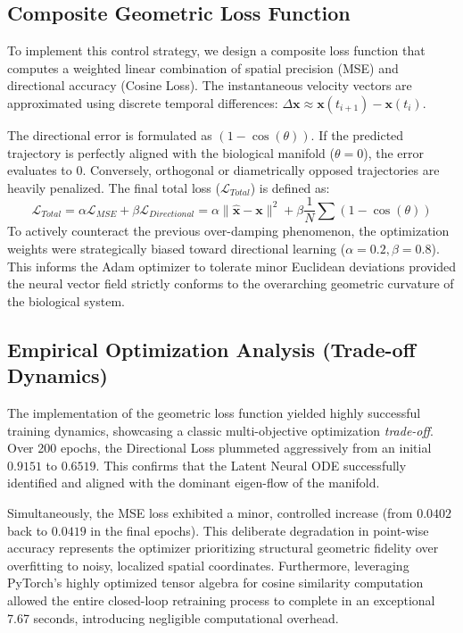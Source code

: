\documentclass[12pt, a4paper]{article}
\begin{document}
	\subsection{Composite Geometric Loss Function}
	To implement this control strategy, we design a composite loss function that computes a weighted linear combination of spatial precision (MSE) and directional accuracy (Cosine Loss). The instantaneous velocity vectors are approximated using discrete temporal differences: $\Delta \mathbf{x} \approx \mathbf{x}(t_{i+1}) - \mathbf{x}(t_i)$.
	
	The directional error is formulated as $(1 - \cos(\theta))$. If the predicted trajectory is perfectly aligned with the biological manifold ($\theta = 0$), the error evaluates to $0$. Conversely, orthogonal or diametrically opposed trajectories are heavily penalized. The final total loss ($\mathcal{L}_{Total}$) is defined as:
	$$ \mathcal{L}_{Total} = \alpha \mathcal{L}_{MSE} + \beta \mathcal{L}_{Directional} = \alpha \| \mathbf{\hat{x}} - \mathbf{x} \|^2 + \beta \frac{1}{N} \sum (1 - \cos(\theta)) $$
	To actively counteract the previous over-damping phenomenon, the optimization weights were strategically biased toward directional learning ($\alpha = 0.2, \beta = 0.8$). This informs the Adam optimizer to tolerate minor Euclidean deviations provided the neural vector field strictly conforms to the overarching geometric curvature of the biological system.
	
	\subsection{Empirical Optimization Analysis (Trade-off Dynamics)}
	The implementation of the geometric loss function yielded highly successful training dynamics, showcasing a classic multi-objective optimization \textit{trade-off}. Over 200 epochs, the Directional Loss plummeted aggressively from an initial $0.9151$ to $0.6519$. This confirms that the Latent Neural ODE successfully identified and aligned with the dominant eigen-flow of the manifold.
	
	Simultaneously, the MSE loss exhibited a minor, controlled increase (from $0.0402$ back to $0.0419$ in the final epochs). This deliberate degradation in point-wise accuracy represents the optimizer prioritizing structural geometric fidelity over overfitting to noisy, localized spatial coordinates. Furthermore, leveraging PyTorch's highly optimized tensor algebra for cosine similarity computation allowed the entire closed-loop retraining process to complete in an exceptional 7.67 seconds, introducing negligible computational overhead.
	
\end{document}
